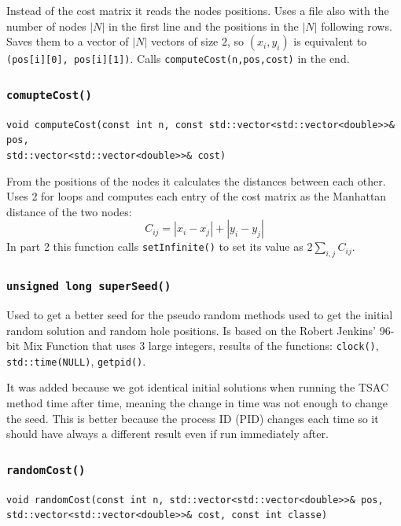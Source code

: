 \documentclass[a4paper,12pt]{article}
\begin{document}
				Instead of the cost matrix it reads the nodes positions.
				Uses a file also with the number of nodes $ |N| $ in the first line and the positions in the $ |N| $ following rows.
				Saves them to a vector of $ |N| $ vectors of size $ 2 $, so $ (x_i, y_i) $ is equivalent to \texttt{(pos[i][0], pos[i][1])}.
				Calls \texttt{computeCost(n,pos,cost)} in the end.
				
			\subsubsection{\texttt{comupteCost()}}
				\hspace{-20pt}\texttt{void computeCost(const int n, const std::vector<std::vector<double>>\& pos, \\ std::vector<std::vector<double>>\& cost)}
					
				From the positions of the nodes it calculates the distances between each other.
				Uses 2 for loops and computes each entry of the cost matrix as the Manhattan distance of the two nodes:
					$$ C_{ij} = |x_i-x_j| + |y_i-y_j| $$
				In part 2 this function calls \texttt{setInfinite()} to set its value as $ 2 \sum_{i,j} C_{ij}  $.
					
			\subsubsection{\texttt{unsigned long superSeed()}}
				Used to get a better seed for the pseudo random methods used to get the initial random solution and random hole positions.
				Is based on the Robert Jenkins' 96-bit Mix Function that uses 3 large integers, results of the functions: \texttt{clock()}, \texttt{std::time(NULL)}, \texttt{getpid()}.
				
				It was added because we got identical initial solutions when running the TSAC method time after time, meaning the change in time was not enough to change the seed.
				This is better because the process ID (PID) changes each time so it should have always a different result even if run immediately after.
				
			\subsubsection{\texttt{randomCost()}}
				\hspace{-20pt}\texttt{void randomCost(const int n, std::vector<std::vector<double>>\& pos, \\ std::vector<std::vector<double>>\& cost, const int classe)}
				
\end{document}
